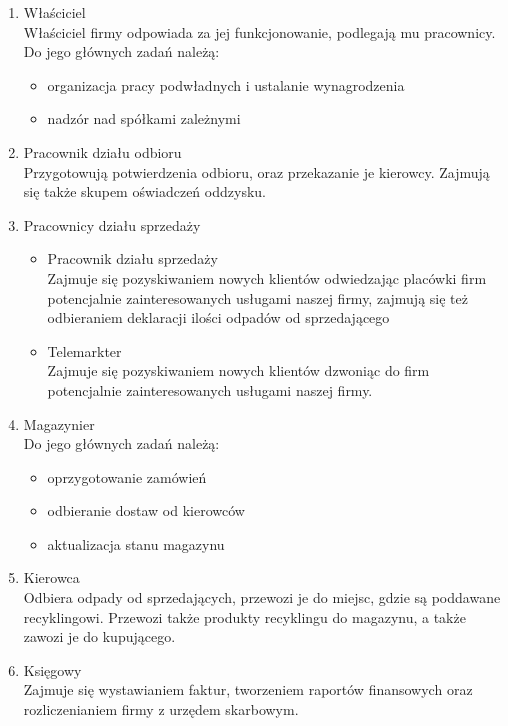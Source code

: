 
\begin{enumerate}
	\item Właściciel \\ 
	Właściciel firmy odpowiada za jej funkcjonowanie, podlegają mu pracownicy. Do jego głównych zadań należą:
	\begin{itemize}
		\item organizacja pracy podwładnych i ustalanie wynagrodzenia
		\item nadzór nad spółkami zależnymi
	\end{itemize}
	\item Pracownik działu odbioru \\
	Przygotowują potwierdzenia odbioru, oraz przekazanie je kierowcy. Zajmują się także skupem oświadczeń oddzysku.
	\item Pracownicy działu sprzedaży
	\begin{itemize}
	\item Pracownik działu sprzedaży\\
	Zajmuje się pozyskiwaniem nowych klientów odwiedzając placówki firm potencjalnie zainteresowanych usługami naszej firmy, zajmują się też odbieraniem deklaracji ilości odpadów od sprzedającego
	\item Telemarkter \\
	Zajmuje się pozyskiwaniem nowych klientów dzwoniąc do firm potencjalnie zainteresowanych usługami naszej firmy.
	\end{itemize}
	\item Magazynier \\
	Do jego głównych zadań należą:
		\begin{itemize}
		\item oprzygotowanie zamówień
		\item odbieranie dostaw od kierowców
		\item aktualizacja stanu magazynu
		\end{itemize}
	\item Kierowca \\
	Odbiera odpady od sprzedających, przewozi je do miejsc, gdzie są poddawane recyklingowi. Przewozi także produkty recyklingu do magazynu, a także zawozi je do kupującego.
	\item Księgowy \\
	Zajmuje się wystawianiem faktur, tworzeniem raportów finansowych oraz rozliczenianiem firmy z urzędem skarbowym.
\end{enumerate}

